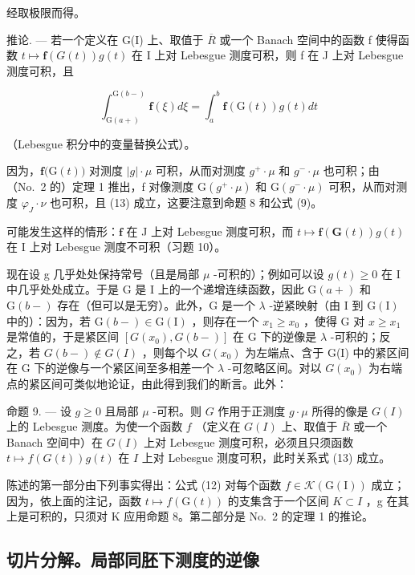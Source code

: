 经取极限而得。

推论. --- 若一个定义在 G(I) 上、取值于 \(\overline{R}\) 或一个 Banach 空间中的函数 f 使得函数 \(t \mapsto \mathbf{f}(G(t))g(t)\) 在 I 上对 Lebesgue 测度可积，则 f 在 J 上对 Lebesgue 测度可积，且

\[
\int_ {\mathrm{G} (a +)} ^ {\mathrm{G} (b -)} \mathbf {f} (\xi) d \xi = \int_ {a} ^ {b} \mathbf {f} (\mathrm{G} (t)) g (t) d t\tag{13}
\]

（Lebesgue 积分中的变量替换公式）。

因为，\(\mathbf{f}\big(\mathrm{G}(t)\big)\) 对测度 \(|g|\cdot\mu\) 可积，从而对测度 \(g^{+}\cdot\mu\) 和 \(g^{-}\cdot\mu\) 也可积；由（No.~2 的）定理 1 推出，f 对像测度 \(\mathrm{G}(g^{+}\cdot\mu)\) 和 \(\mathrm{G}(g^{-}\cdot\mu)\) 可积，从而对测度 \(\varphi_{J}\cdot\nu\) 也可积，且 (13) 成立，这要注意到命题 8 和公式 (9)。

可能发生这样的情形：\(\mathbf{f}\) 在 J 上对 Lebesgue 测度可积，而 \(t \mapsto \mathbf{f}(\mathbf{G}(t))g(t)\) 在 I 上对 Lebesgue 测度不可积（习题 10）。

现在设 g 几乎处处保持常号（且是局部 \(\mu\) -可积的）；例如可以设 \(g(t) \geqslant 0\) 在 I 中几乎处处成立。于是 G 是 I 上的一个递增连续函数，因此 \(\mathrm{G}(a+)\) 和 \(\mathrm{G}(b-)\) 存在（但可以是无穷）。此外，G 是一个 \(\lambda\) -逆紧映射（由 I 到 \(\mathrm{G}(\mathrm{I})\) 中的）：因为，若 \(\mathrm{G}(b-) \in \mathrm{G}(\mathrm{I})\) ，则存在一个 \(x_{1} \geqslant x_{0}\) ，使得 G 对 \(x \geqslant x_{1}\) 是常值的，于是紧区间 \([G(x_{0}), G(b-)]\) 在 G 下的逆像是 \(\lambda\) -可积的；反之，若 \(G(b-) \notin G(I)\) ，则每个以 \(G(x_{0})\) 为左端点、含于 G(I) 中的紧区间在 G 下的逆像与一个紧区间至多相差一个 \(\lambda\) -可忽略区间。对以 \(G(x_{0})\) 为右端点的紧区间可类似地论证，由此得到我们的断言。此外：

命题 9. --- 设 \(g \geqslant 0\) 且局部 \(\mu\) -可积。则 \(G\) 作用于正测度 \(g \cdot \mu\) 所得的像是 \(G(I)\) 上的 Lebesgue 测度。为使一个函数 \(f\) （定义在 \(G(I)\) 上、取值于 \(\overline{R}\) 或一个 Banach 空间中）在 \(G(I)\) 上对 Lebesgue 测度可积，必须且只须函数 \(t \mapsto f(G(t))g(t)\) 在 \(I\) 上对 Lebesgue 测度可积，此时关系式 (13) 成立。

陈述的第一部分由下列事实得出：公式 (12) 对每个函数 \(f \in \mathcal{K}(\mathrm{G}(\mathrm{I}))\) 成立；因为，依上面的注记，函数 \(t \mapsto f(\mathrm{G}(t))\) 的支集含于一个区间 \(K \subset I\) ，g 在其上是可积的，只须对 K 应用命题 8。第二部分是 No.~2 的定理 1 的推论。

\subsection{切片分解。局部同胚下测度的逆像}

